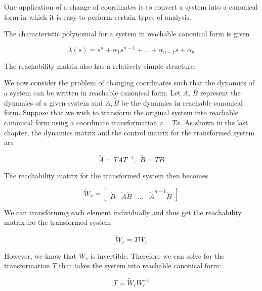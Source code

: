 One application of a change of coordinates is to convert a system into a
canonical form in which it is easy to perform certain types of analysis.




The characteristic polynomial for a system in reachable canonical form is given

\begin{equation}
\lambda(s) = s^n +\alpha_1s^{n-1}+ \dots + \alpha_{n-1}s + \alpha_n
\end{equation}

The reachability matrix also has a relatively simple structure:

We now consider the problem of changing coordinates such that the dynamics
of a system can be written in reachable canonical form. Let $A$, $B$ represent the
dynamics of a given system and $\tilde{A}, \tilde{B}$ be the dynamics in reachable canonical form.
Suppose that we wish to transform the original system into reachable canonical
form using a coordinate transformation $z = Tx$. As shown in the last chapter, the
dynamics matrix and the control matrix for the transformed system are


\begin{equation}
\tilde{A} = TAT^{-1}, ~~ \tilde{B} = TB
\end{equation}

The reachability matrix for the transformed system then becomes

\begin{equation}
\tilde{W}_r = \begin{bmatrix}
 \tilde{B} & \tilde{A}\tilde{B} & \ldots & \tilde{A}^{n-1}\tilde{B} 
\end{bmatrix}
\end{equation}

We can transforming each element individually and thus get the reachability matrix fro the transformed system

\begin{equation}
\tilde{W}_r = TW_r
\end{equation}

However, we know that $W_r$ is invertible. Therefore we can solve for the transformation $T$ that takes the system into reachable canonical form:

\begin{equation}
T = \tilde{W}_r W_{r}^{-1}
\end{equation}


